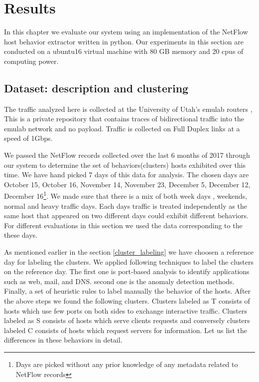 
\chapter{Results}

In this chapter we evaluate our system using an implementation of the NetFlow host behavior extractor written in python. Our experiments in this section are conducted on a ubuntu16 virtual machine with 80 GB memory and 20 cpus of computing power. 

\section{Dataset: description and clustering}
The traffic analyzed here is collected at the University of Utah's emulab routers \cite{White+:osdi02}, This is a private repository that contains traces of bidirectional traffic into the emulab network and no payload. Traffic is collected on Full Duplex links at a speed of 1Gbps.

We passed the NetFlow records collected over the last 6 months of 2017 through our system to determine the set of behaviors(clusters) hosts exhibited over this time. We have hand picked 7 days of this data for analysis. The chosen days are October 15, October 16, November 14, November 23, December 5, December 12, December 16\footnote{Days are picked without any prior knowledge of any metadata related to NetFlow records}. We made sure that there is a mix of both week days , weekends, normal and heavy traffic days. Each days traffic is treated independently as the same host that appeared on two different days could exhibit different behaviors. For different evaluations in this section we used the data corresponding to the these days.

As mentioned earlier in the section \ref{cluster_labeling} we have choosen a reference day for labeling the clusters. We applied following techniques to label the clusters on the reference day. The first one is port-based analysis to identify applications such as web, mail, and DNS. second one is the anomaly detection methods. Finally, a set of heuristic rules to label manually the behavior of the hosts. After the above steps we found the following clusters. Clusters labeled as T consists of hosts which use few ports on both sides to exchange interactive traffic. Clusters labeled as S consists of hosts which serve clients requests and conversely clusters labeled C consists of hosts which request servers for information. Let us list the differences in these behaviors in detail.

